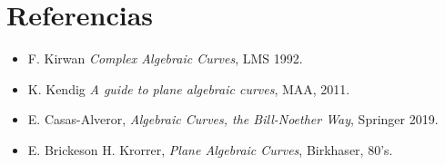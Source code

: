 \documentclass[12pt]{report}
\newcounter{it}
\theoremstyle{largebreak}
\begin{document}
    \newpage

    \section*{Referencias}

    \begin{itemize}
        \item F. Kirwan \textit{Complex Algebraic Curves}, LMS 1992.
        \item K. Kendig \textit{A guide to plane algebraic curves}, MAA, 2011.
        \item E. Casas-Alveror, \textit{Algebraic Curves, the Bill-Noether Way}, Springer 2019.
        \item E. Brickeson H. Krorrer, \textit{Plane Algebraic Curves}, Birkhaser, 80's.
    \end{itemize}
    
\end{document}
